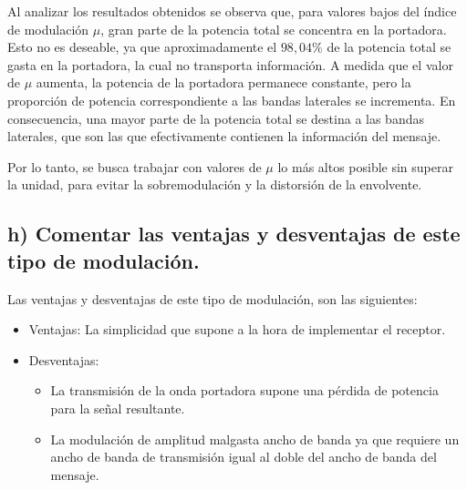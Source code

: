     Al analizar los resultados obtenidos se observa que, para valores bajos del índice de modulación $\mu$, gran parte de la potencia total se concentra en la portadora. Esto no es deseable, ya que aproximadamente el $98{,}04\%$ de la potencia total se gasta en la portadora, la cual no transporta información. 
A medida que el valor de $\mu$ aumenta, la potencia de la portadora permanece constante, pero la proporción de potencia correspondiente a las bandas laterales se incrementa. En consecuencia, una mayor parte de la potencia total se destina a las bandas laterales, que son las que efectivamente contienen la información del mensaje. 

Por lo tanto, se busca trabajar con valores de $\mu$ lo más altos posible sin superar la unidad, para evitar la sobremodulación y la distorsión de la envolvente.

    
\subsection*{h) Comentar las ventajas y desventajas de este tipo de modulación.}

Las ventajas y desventajas de este tipo de modulación, son las siguientes:

\begin{itemize}
    \item Ventajas: La simplicidad que supone a la hora de implementar el receptor.
    \item Desventajas:
        \begin{itemize}
            \item La transmisión de la onda portadora supone una pérdida de potencia para la señal resultante.
            \item La modulación de amplitud malgasta ancho de banda ya que requiere un ancho de banda de transmisión igual al doble del ancho de banda del mensaje.
        \end{itemize}
\end{itemize}